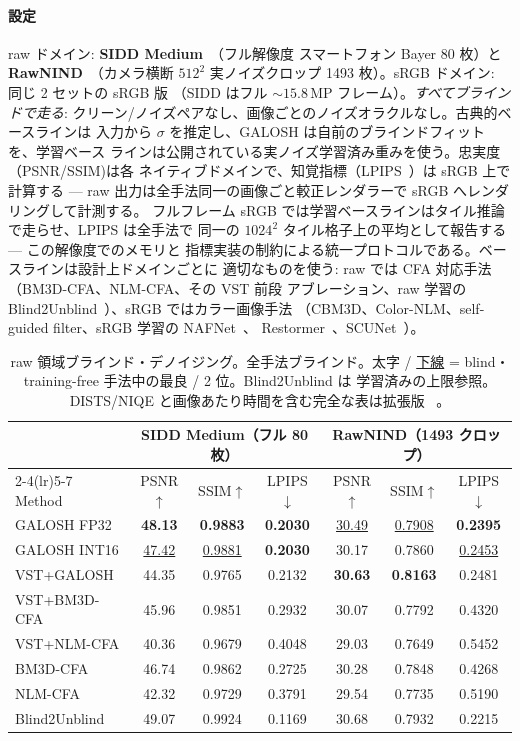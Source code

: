 \documentclass[journal]{IEEEtran}
\begin{document}
\paragraph{設定} raw ドメイン: \textbf{SIDD Medium}~\cite{sidd}（フル解像度
スマートフォン Bayer 80 枚）と \textbf{RawNIND}~\cite{rawnind}（カメラ横断
$512^2$ 実ノイズクロップ 1493 枚）。sRGB ドメイン: 同じ 2 セットの sRGB 版
（SIDD はフル ${\sim}15.8$\,MP フレーム）。\emph{すべてブラインドで走る}:
クリーン/ノイズペアなし、画像ごとのノイズオラクルなし。古典的ベースラインは
入力から $\sigma$ を推定し、GALOSH は自前のブラインドフィットを、学習ベース
ラインは公開されている実ノイズ学習済み重みを使う。忠実度（PSNR/SSIM)は各
ネイティブドメインで、知覚指標（LPIPS~\cite{lpips}）は sRGB 上で計算する ---
raw 出力は全手法同一の画像ごと較正レンダラーで sRGB へレンダリングして計測する。
フルフレーム sRGB では学習ベースラインはタイル推論で走らせ、LPIPS は全手法で
同一の $1024^2$ タイル格子上の平均として報告する --- この解像度でのメモリと
指標実装の制約による統一プロトコルである。ベースラインは設計上ドメインごとに
適切なものを使う: raw では CFA 対応手法（BM3D-CFA、NLM-CFA、その VST 前段
アブレーション、raw 学習の Blind2Unblind~\cite{b2u}）、sRGB ではカラー画像手法
（CBM3D、Color-NLM、self-guided filter、sRGB 学習の NAFNet~\cite{nafnet}、
Restormer~\cite{restormer}、SCUNet~\cite{scunet}）。

\begin{table}[t]
\centering
\caption{raw 領域ブラインド・デノイジング。全手法ブラインド。太字 /
\underline{下線} = blind・training-free 手法中の最良 / 2 位。Blind2Unblind は
学習済みの上限参照。DISTS/NIQE と画像あたり時間を含む完全な表は拡張版
~\cite{galosharxiv}。}
\label{tab:raw}
\setlength{\tabcolsep}{3pt}
\footnotesize
\begin{tabular}{l ccc ccc}
\toprule
 & \multicolumn{3}{c}{SIDD Medium（フル 80 枚）} & \multicolumn{3}{c}{RawNIND（1493 クロップ）}\\
\cmidrule(lr){2-4}\cmidrule(lr){5-7}
Method & PSNR$\uparrow$ & SSIM$\uparrow$ & LPIPS$\downarrow$ & PSNR$\uparrow$ & SSIM$\uparrow$ & LPIPS$\downarrow$\\
\midrule
GALOSH FP32   & \textbf{48.13} & \textbf{0.9883} & \textbf{0.2030} & \underline{30.49} & \underline{0.7908} & \textbf{0.2395}\\
GALOSH INT16  & \underline{47.42} & \underline{0.9881} & \textbf{0.2030} & 30.17 & 0.7860 & \underline{0.2453}\\
VST+GALOSH    & 44.35 & 0.9765 & 0.2132 & \textbf{30.63} & \textbf{0.8163} & 0.2481\\
VST+BM3D-CFA  & 45.96 & 0.9851 & 0.2932 & 30.07 & 0.7792 & 0.4320\\
VST+NLM-CFA   & 40.36 & 0.9679 & 0.4048 & 29.03 & 0.7649 & 0.5452\\
BM3D-CFA      & 46.74 & 0.9862 & 0.2725 & 30.28 & 0.7848 & 0.4268\\
NLM-CFA       & 42.32 & 0.9729 & 0.3791 & 29.54 & 0.7735 & 0.5190\\
\midrule
Blind2Unblind & 49.07 & 0.9924 & 0.1169 & 30.68 & 0.7932 & 0.2215\\
\bottomrule
\end{tabular}
\end{table}
\end{document}
